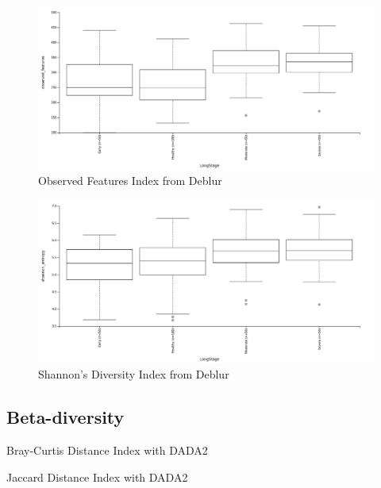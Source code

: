 \documentclass[a4paper]{article}
\begin{document}
            \begin{figure}[p]
                \centering
                \includegraphics[width=0.8 \linewidth]{figures/AlphaDiversity/Deblur/observed.png}
                \caption{Observed Features Index from Deblur}
                \label{fig:observed-deblur}
            \end{figure}

            \begin{figure}[p]
                \centering
                \includegraphics[width=0.8 \linewidth]{figures/AlphaDiversity/Deblur/shannon.png}
                \caption{Shannon's Diversity Index from Deblur}
                \label{fig:shannon-deblur}
            \end{figure}

        \subsection{Beta-diversity}

            \begin{table}[p]
                \centering
                \caption{Bray-Curtis Distance Index with DADA2}
                \label{tb:bray-dada2}
            \end{table}

            \begin{table}[p]
                \centering
                \caption{Jaccard Distance Index with DADA2}
                \label{tb:jaccard-dada2}
            \end{table}
\end{document}
